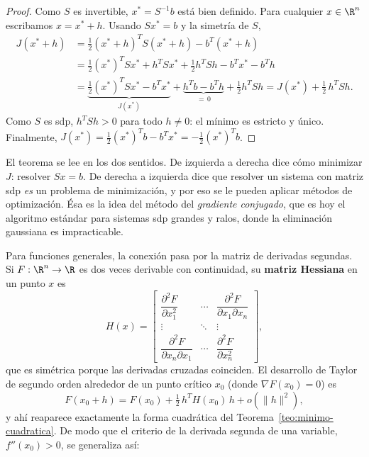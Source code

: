 \begin{proof}
Como $S$ es invertible, $x^*=S^{-1}b$ está bien definido. Para cualquier
$x\in\R^n$ escribamos $x = x^*+h$. Usando $Sx^*=b$ y la simetría de $S$,
\begin{align*}
J(x^*+h) &= \tfrac12(x^*+h)^TS(x^*+h) - b^T(x^*+h)\\
&= \tfrac12 (x^*)^TSx^* + h^TSx^* + \tfrac12 h^TSh - b^Tx^* - b^Th\\
&= \underbrace{\tfrac12 (x^*)^TSx^* - b^Tx^*}_{J(x^*)}
 + \underbrace{h^Tb - b^Th}_{=\,0} + \tfrac12 h^TSh
= J(x^*) + \tfrac12\, h^TSh .
\end{align*}
Como $S$ es sdp, $h^TSh>0$ para todo $h\neq0$: el mínimo es estricto y único.
Finalmente, $J(x^*)=\frac12(x^*)^Tb - b^Tx^* = -\frac12 (x^*)^Tb$.
\end{proof}

\begin{remark}\label{obs:sistema-minimizar}
El teorema se lee en los dos sentidos. De izquierda a derecha dice cómo
minimizar $J$: resolver $Sx=b$. De derecha a izquierda dice que resolver un
sistema con matriz sdp \emph{es} un problema de minimización, y por eso se le
pueden aplicar métodos de optimización. Ésa es la idea del método del
\emph{gradiente conjugado}, que es hoy el algoritmo estándar para sistemas sdp
grandes y ralos, donde la eliminación gaussiana es impracticable.
\end{remark}

Para funciones generales, la conexión pasa por la matriz de derivadas
segundas. Si $F:\R^n\to\R$ es dos veces derivable con continuidad, su
\textbf{matriz Hessiana} en un punto $x$ es
\[
H(x) = \begin{bmatrix}
\dfrac{\partial^2F}{\partial x_1^2} & \cdots & \dfrac{\partial^2F}{\partial x_1\partial x_n}\\[8pt]
\vdots & \ddots & \vdots\\[4pt]
\dfrac{\partial^2F}{\partial x_n\partial x_1} & \cdots & \dfrac{\partial^2F}{\partial x_n^2}
\end{bmatrix} ,
\]
que es simétrica porque las derivadas cruzadas coinciden. El desarrollo de
Taylor de segundo orden alrededor de un punto crítico $x_0$ (donde
$\nabla F(x_0)=0$) es
\[
F(x_0+h) = F(x_0) + \tfrac12\, h^T H(x_0)\, h + o(\|h\|^2) ,
\]
y ahí reaparece exactamente la forma cuadrática del
Teorema~\ref{teo:minimo-cuadratica}. De modo que el criterio de la derivada
segunda de una variable, $f''(x_0)>0$, se generaliza así:

